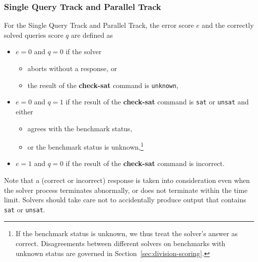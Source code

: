 \documentclass[12pt]{article}
\newcommand{\akey}[1]{\textbf{#1}\xspace}
\newcommand{\maintrack}{Single Query Track\xspace}
\newcommand{\paralleltrack}{Parallel Track\xspace}
\begin{document}
\subsubsection{\maintrack and \paralleltrack}
  For the \maintrack and \paralleltrack, the error score
  $e$ and the correctly solved queries score $q$ are defined as
  \begin{itemize}
  \item $e=0$ and $q=0$ if the solver
    \begin{itemize}[noitemsep,nolistsep]
      \item aborts without a response, or
      \item  the result of the \akey{check-sat} command is \texttt{unknown},
    \end{itemize}
  \item $e=0$ and $q=1$ if the result of the \akey{check-sat} command is
      \texttt{sat} or \texttt{unsat} and either
    \begin{itemize}[noitemsep,nolistsep]
      \item agrees with the benchmark status,
      \item or the benchmark status
        is unknown,\footnote{If the benchmark status is unknown, we thus treat
        the solver's answer as correct.  Disagreements between different
        solvers on benchmarks with unknown status are governed in
        Section~\ref{sec:division-scoring}.}
    \end{itemize}
  \item $e=1$ and $q=0$ if the result of the \akey{check-sat} command is
    incorrect.
  \end{itemize}
%
Note that a (correct or incorrect) response is taken into
consideration even when the solver process terminates abnormally, or
does not terminate within the time limit.  Solvers should take care
not to accidentally produce output that contains \texttt{sat} or
\texttt{unsat}.
\end{document}
